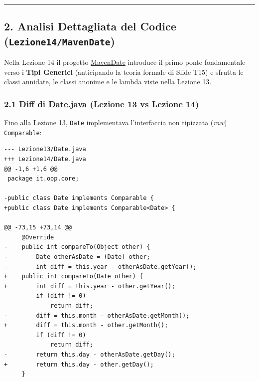 \documentclass[11pt,a4paper]{article}
\newcommand{\passthrough}[1]{#1}
\begin{document}
\begin{center}\rule{0.5\linewidth}{0.5pt}\end{center}

\subsection{\texorpdfstring{2. Analisi Dettagliata del Codice
(\texttt{Lezione14/MavenDate})}{2. Analisi Dettagliata del Codice (Lezione14/MavenDate)}}\label{analisi-dettagliata-del-codice-lezione14mavendate}

Nella Lezione 14 il progetto
\href{file:///home/wally/Documenti/GitHub/Programmazione-II/25-26/Teoria-e-Esercitazioni/Codice-20260902/Lezione14/MavenDate}{MavenDate}
introduce il primo ponte fondamentale verso i \textbf{Tipi Generici}
(anticipando la teoria formale di Slide T15) e sfrutta le classi
annidate, le classi anonime e le lambda viste nella Lezione 13.

\subsubsection{\texorpdfstring{2.1 Diff di
\href{file:///home/wally/Documenti/GitHub/Programmazione-II/25-26/Teoria-e-Esercitazioni/Codice-20260902/Lezione14/MavenDate/src/main/java/it/oop/core/Date.java\#L1-L80}{Date.java}
(Lezione 13 vs Lezione
14)}{2.1 Diff di Date.java (Lezione 13 vs Lezione 14)}}\label{diff-di-date.java-lezione-13-vs-lezione-14}

Fino alla Lezione 13, \passthrough{\lstinline!Date!} implementava
l'interfaccia non tipizzata (\emph{raw})
\passthrough{\lstinline!Comparable!}:

\begin{lstlisting}
--- Lezione13/Date.java
+++ Lezione14/Date.java
@@ -1,6 +1,6 @@
 package it.oop.core;
 
-public class Date implements Comparable {
+public class Date implements Comparable<Date> {
 
@@ -73,15 +73,14 @@
     @Override
-    public int compareTo(Object other) {
-        Date otherAsDate = (Date) other;
-        int diff = this.year - otherAsDate.getYear();
+    public int compareTo(Date other) {
+        int diff = this.year - other.getYear();
         if (diff != 0)
             return diff;
-        diff = this.month - otherAsDate.getMonth();
+        diff = this.month - other.getMonth();
         if (diff != 0)
             return diff;
-        return this.day - otherAsDate.getDay();
+        return this.day - other.getDay();
     }
\end{lstlisting}
\end{document}
